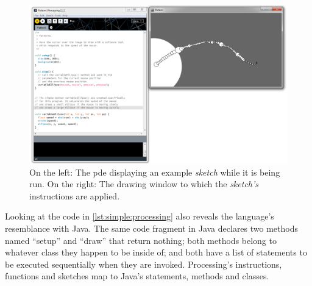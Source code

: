 \documentclass{./llncs2e/llncs}
\begin{document}
	\begin{figure}
		\centering
		\includegraphics[width=1.0\textwidth]{img/proc_dev_env}
		\caption{On the left: The \ac{pde} displaying an example \emph{sketch} while it is being run. On the right: The drawing window to which the \emph{sketch's} instructions are applied.}
		\label{fig:proc:dev:env}
	\end{figure} 
	
	Looking at the code in \ref{lst:simple:processing} also reveals the language's resemblance with Java. 
	The same code fragment in Java declares two methods named ``setup'' and ``draw'' that return nothing; both methods belong to whatever class they happen to be inside of; and both have a list of statements to be executed sequentially when they are invoked. 
	Processing's instructions, functions and sketches map to Java's statements, methods and classes.
	
\end{document}
